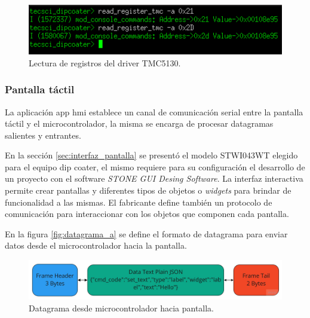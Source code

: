 \begin{figure}[h!]
	\centering
	\includegraphics[width=1\textwidth]{./Figures/consola_6.png}
	\caption{Lectura de registros del driver TMC5130.}
	\label{fig:comando_lectura}
\end{figure}


\subsubsection{Pantalla táctil}

La aplicación app hmi establece un canal de comunicación serial entre la pantalla táctil y el microcontrolador, la misma se encarga de procesar datagramas salientes y entrantes. 

En la sección \ref{sec:interfaz_pantalla} se presentó el modelo STWI043WT elegido para el equipo dip coater, el mismo requiere para su configuración el desarrollo de un proyecto con el software \textit{STONE GUI Desing Software}. La interfaz interactiva permite crear pantallas y diferentes tipos de objetos o \textit{widgets} para brindar de funcionalidad a las mismas. El fabricante define también un protocolo de comunicación \citep{web_protocolo_stone} para interaccionar con los objetos que componen cada pantalla.




En la figura \ref{fig:datagrama_a} se define el formato de datagrama para enviar datos desde el microcontrolador hacia la pantalla. 

\begin{figure}[h!]
	\centering
	\includegraphics[width=1\textwidth]{./Figures/datagrama_b.jpg}
	\caption{Datagrama desde microcontrolador hacia pantalla.}
	\label{fig:datagrama_b}
\end{figure}

